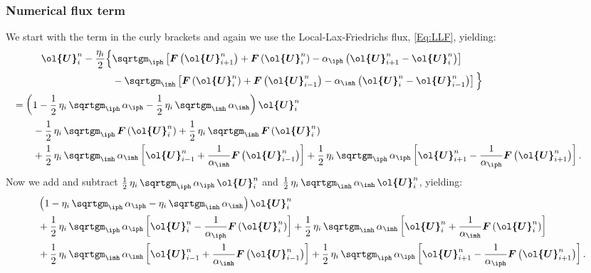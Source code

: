 \documentclass[10pt,preprint]{aastex}
\begin{document}
\subsubsection{Numerical flux term}
We start with the term in the curly brackets and again we use the Local-Lax-Friedrichs flux, \eqref{Eq:LLF}, yielding:
\begin{align*}
    \vect{\ol{U}}^{n}_{i}-\f{\eta_{i}}{2}\Big\{&\sqrtgm_{\iph}\left[\vect{F}\left(\vect{\ol{U}}^{n}_{i+1}\right)+\vect{F}\left(\vect{\ol{U}}^{n}_{i}\right)-\alpha_{\iph}\left(\vect{\ol{U}}^{n}_{i+1}-\vect{\ol{U}}^{n}_{i}\right)\right]\\
    &-\sqrtgm_{\imh}\left[\vect{F}\left(\vect{\ol{U}}^{n}_{i}\right)+\vect{F}\left(\vect{\ol{U}}^{n}_{i-1}\right)-\alpha_{\imh}\left(\vect{\ol{U}}^{n}_{i}-\vect{\ol{U}}^{n}_{i-1}\right)\right]\Big\}\\
    &\hspace{-10em}=\left(1-\f{1}{2}\,\eta_{i}\,\sqrtgm_{\iph}\,\alpha_{\iph}-\f{1}{2}\,\eta_{i}\,\sqrtgm_{\imh}\,\alpha_{\imh}\right)\vect{\ol{U}}^{n}_{i}\\
    &\hspace{-8em}-\f{1}{2}\,\eta_{i}\,\sqrtgm_{\iph}\,\vect{F}\left(\vect{\ol{U}}^{n}_{i}\right)+\f{1}{2}\,\eta_{i}\,\sqrtgm_{\imh}\,\vect{F}\left(\vect{\ol{U}}^{n}_{i}\right)\\
    &\hspace{-8em}+\f{1}{2}\,\eta_{i}\,\sqrtgm_{\imh}\,\alpha_{\imh}\left[\vect{\ol{U}}^{n}_{i-1}+\f{1}{\alpha_{\imh}}\vect{F}\left(\vect{\ol{U}}^{n}_{i-1}\right)\right]+\f{1}{2}\,\eta_{i}\,\sqrtgm_{\iph}\,\alpha_{\iph}\left[\vect{\ol{U}}^{n}_{i+1}-\f{1}{\alpha_{\iph}}\vect{F}\left(\vect{\ol{U}}^{n}_{i+1}\right)\right].
\end{align*}
Now we add and subtract $\f{1}{2}\,\eta_{i}\,\sqrtgm_{\iph}\,\alpha_{\iph}\,\vect{\ol{U}}^{n}_{i}$ and $\f{1}{2}\,\eta_{i}\,\sqrtgm_{\imh}\,\alpha_{\imh}\,\vect{\ol{U}}^{n}_{i}$, yielding:
\begin{align*}
    &\left(1-\eta_{i}\,\sqrtgm_{\iph}\,\alpha_{\iph}-\eta_{i}\,\sqrtgm_{\imh}\,\alpha_{\imh}\right)\vect{\ol{U}}^{n}_{i}\\
    &+\f{1}{2}\,\eta_{i}\,\sqrtgm_{\iph}\,\alpha_{\iph}\left[\vect{\ol{U}}^{n}_{i}-\f{1}{\alpha_{\iph}}\vect{F}\left(\vect{\ol{U}}^{n}_{i}\right)\right]+\f{1}{2}\,\eta_{i}\,\sqrtgm_{\imh}\,\alpha_{\imh}\left[\vect{\ol{U}}^{n}_{i}+\f{1}{\alpha_{\imh}}\vect{F}\left(\vect{\ol{U}}^{n}_{i}\right)\right]\\
    &+\f{1}{2}\,\eta_{i}\,\sqrtgm_{\imh}\,\alpha_{\imh}\left[\vect{\ol{U}}^{n}_{i-1}+\f{1}{\alpha_{\imh}}\vect{F}\left(\vect{\ol{U}}^{n}_{i-1}\right)\right]+\f{1}{2}\,\eta_{i}\,\sqrtgm_{\iph}\,\alpha_{\iph}\left[\vect{\ol{U}}^{n}_{i+1}-\f{1}{\alpha_{\iph}}\vect{F}\left(\vect{\ol{U}}^{n}_{i+1}\right)\right].
\end{align*}
\end{document}
